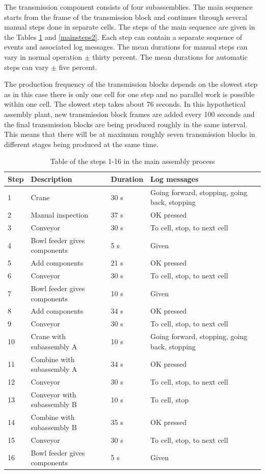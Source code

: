\documentclass[journal]{IEEEtran}
\begin{document}
The transmission component consists of four subassemblies. The main sequence starts from the frame of the transmission block
and continues through several manual steps done in separate cells. The steps of the main sequence are given in
the Tables \ref{mainsteps1} and \ref{mainsteps2}.
Each step can contain a separate sequence of events and associated log messages.
The mean durations for manual steps can vary in normal operation $\pm$ thirty percent. The mean durations for automatic steps can vary
$\pm$ five percent.

The production frequency of the transmission blocks depends on the slowest step as in this case there is only one cell for one step and no
parallel work is possible within one cell. The slowest step takes about 76 seconds. In this hypothetical assembly plant, new transmission block
frames are added every 100 seconds and the final transmission blocks are being produced roughly in the same interval. This means that there
will be at maximum roughly seven transmission blocks in different stages being produced at the same time.

\begin{table}[!t]
\renewcommand{\arraystretch}{1.3}
\caption{Table of the steps 1-16 in the main assembly process}
\label{mainsteps1}
\centering
\begin{tabular}{|p{5mm}|p{20mm}|p{10mm}|p{15mm}|p{15mm}|}
\hline
Step & Description & Duration & Log messages \\
\hline
\hline
1 & Crane & 30 s & Going forward, stopping, going back, stopping \\
\hline
2 & Manual inspection & 37 s & OK pressed \\
\hline
3 & Conveyor & 30 s & To cell, stop, to next cell \\
\hline
4 & Bowl feeder gives components & 5 s & Given \\
\hline
5 & Add components & 21 s & OK pressed \\
\hline
6 & Conveyor & 30 s & To cell, stop, to next cell \\
\hline
7 & Bowl feeder gives components & 10 s & Given \\
\hline
8 & Add components & 34 s & OK pressed \\
\hline
9 & Conveyor & 30 s & To cell, stop, to next cell \\
\hline
10 & Crane with subassembly A & 10 s & Going forward, stopping, going back, stopping \\
\hline
11 & Combine with subassembly A & 34 s & OK pressed \\
\hline
12 & Conveyor & 30 s & To cell, stop, to next cell \\
\hline
13 & Conveyor with subassembly B & 10 s & To cell, stop \\
\hline
14 & Combine with subassembly B & 35 s & OK pressed \\
\hline
15 & Conveyor & 30 s & To cell, stop, to next cell \\
\hline
16 & Bowl feeder gives components & 5 s & Given \\
\hline
\end{tabular}
\end{table}
\end{document}
